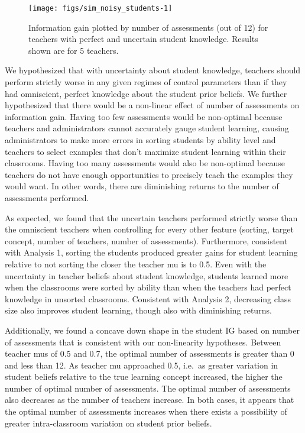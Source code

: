 \documentclass[man]{apa6}
\newenvironment{CodeChunk}{}{}
\begin{document}
\begin{CodeChunk}
\begin{figure*}[t]
\texttt{[image: figs/sim\_noisy\_students-1]} \caption[Information gain plotted by number of assessments (out of 12) for teachers with perfect and uncertain student knowledge]{Information gain plotted by number of assessments (out of 12) for teachers with perfect and uncertain student knowledge. Results shown are for 5 teachers.}\label{fig:sim_noisy_students}
\end{figure*}
\end{CodeChunk}

We hypothesized that with uncertainty about student knowledge, teachers
should perform strictly worse in any given regimes of control parameters
than if they had omniscient, perfect knowledge about the student prior
beliefs. We further hypothesized that there would be a non-linear effect
of number of assessments on information gain. Having too few assessments
would be non-optimal because teachers and administrators cannot
accurately gauge student learning, causing administrators to make more
errors in sorting students by ability level and teachers to select
examples that don't maximize student learning within their classrooms.
Having too many assessments would also be non-optimal because teachers
do not have enough opportunities to precisely teach the examples they
would want. In other words, there are diminishing returns to the number
of assessments performed.

As expected, we found that the uncertain teachers performed strictly
worse than the omniscient teachers when controlling for every other
feature (sorting, target concept, number of teachers, number of
assessments). Furthermore, consistent with Analysis 1, sorting the
students produced greater gains for student learning relative to not
sorting the closer the teacher mu is to 0.5. Even with the uncertainty
in teacher beliefs about student knowledge, students learned more when
the classrooms were sorted by ability than when the teachers had perfect
knowledge in unsorted classrooms. Consistent with Analysis 2, decreasing
class size also improves student learning, though also with diminishing
returns.

Additionally, we found a concave down shape in the student IG based on
number of assessments that is consistent with our non-linearity
hypotheses. Between teacher mus of 0.5 and 0.7, the optimal number of
assessments is greater than 0 and less than 12. As teacher mu approached
0.5, i.e.~as greater variation in student beliefs relative to the true
learning concept increased, the higher the number of optimal number of
assessments. The optimal number of assessments also decreases as the
number of teachers increase. In both cases, it appears that the optimal
number of assessments increases when there exists a possibility of
greater intra-classroom variation on student prior beliefs.
\end{document}
